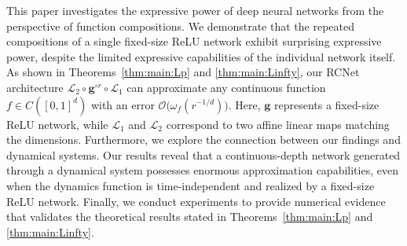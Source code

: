 \documentclass[nohyperref]{article}
\theoremstyle{plain}
\theoremstyle{definition}
\theoremstyle{remark}
\begin{document}
This paper investigates the expressive power of deep neural networks from the perspective of function compositions. 
We demonstrate that  the repeated compositions of a single fixed-size ReLU network exhibit 
surprising
expressive power, despite the 
limited expressive capabilities of the individual network itself. 
As shown in Theorems~\ref{thm:main:Lp} and \ref{thm:main:Linfty}, our RCNet architecture $\mathcal{L}_2\circ \bm{g}^{\circ r}\circ \bm{\mathcal{L}}_1$ can approximate any continuous function $f\in C([0,1]^d)$ with an error $\mathcal{O}\big(\omega_f(r^{-1/d})\big)$. Here, $\bm{g}$ represents a fixed-size ReLU network, while $\bm{\mathcal{L}}_1$ and $\mathcal{L}_2$ correspond to two affine linear maps matching the dimensions.
Furthermore, we explore the connection between our findings and dynamical systems. Our results reveal that a continuous-depth network generated through a dynamical system possesses %
enormous
approximation capabilities, even when the dynamics function is time-independent and realized by a fixed-size ReLU network. 
Finally, we conduct experiments to provide numerical evidence that validates the theoretical results stated in Theorems~\ref{thm:main:Lp} and \ref{thm:main:Linfty}.

\end{document}
